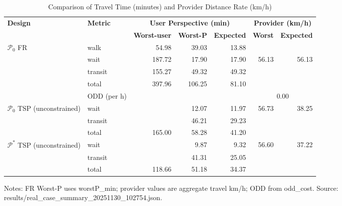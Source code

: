 \begin{table}[t]
\centering
\caption{Comparison of Travel Time (minutes) and Provider Distance Rate (km/h)}
\begin{tabular}{l l r r r r r}
\toprule
\textbf{Design} & \textbf{Metric} & 
\multicolumn{3}{c}{\textbf{User Perspective (min)}} & 
\multicolumn{2}{c}{\textbf{Provider (km/h)}} \\
\cmidrule(lr){3-5}\cmidrule(lr){6-7}
& & \textbf{Worst-user} & \textbf{Worst-P} & \textbf{Expected} & \textbf{Worst} & \textbf{Expected} \\
\midrule
$\mathcal{P}_0$ FR & walk    & 54.98 & 39.03 & 13.88 &        &        \\
                   & wait    & 187.72 & 17.90 & 17.90 & 56.13  & 56.13  \\
                   & transit & 155.27 & 49.32 & 49.32 &        &        \\
                   & total   & 397.96 & 106.25 & 81.10 &       &        \\
                   & ODD (per h) &  &  &  & \multicolumn{2}{c}{0.00} \\
\midrule
$\mathcal{P}_0$ TSP (unconstrained) & wait    &  & 12.07 & 11.97 & 56.73 & 38.25 \\
                                    & transit &  & 46.21 & 29.23 &        &       \\
                                    & total   & 165.00 & 58.28 & 41.20 &        &       \\
\midrule
$\mathcal{P}^*$ TSP (unconstrained) & wait    &  & 9.87 & 9.32 & 56.60 & 37.22 \\
                                    & transit &  & 41.31 & 25.05 &        &       \\
                                    & total   & 118.66 & 51.18 & 34.37 &        &       \\
\bottomrule
\end{tabular}

\vspace{0.5ex}
\small
Notes: FR Worst-P uses worstP\_min; provider values are aggregate travel km/h; ODD from odd\_cost. Source: results/real_case_summary_20251130_102754.json.
\end{table}
